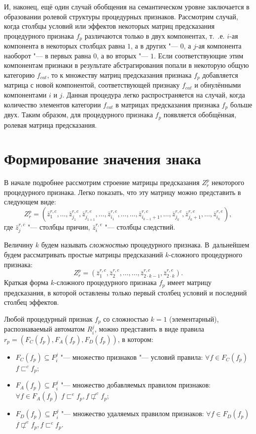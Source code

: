 \documentclass[a4paper, 12pt]{article}
\theoremstyle{plain}
\begin{document}
	И, наконец, ещё один случай обобщения на семантическом уровне заключается в образовании ролевой структуры процедурных признаков. Рассмотрим случай, когда столбцы условий или эффектов некоторых матриц предсказания процедурного признака $f_p$ различаются только в двух компонентах, т.~.е. $i$-ая компонента в некоторых столбцах равна $1$, а в других "--- $0$, а $j$-ая компонента наоборот "--- в первых равна $0$, а во вторых "--- $1$. Если соответствующие этим компонентам признаки в результате абстрагирования попали в некоторую общую категорию $f_{cat}$, то к множеству матриц предсказания признака $f_p$ добавляется матрица с новой компонентой, соответствующей признаку $f_{cat}$ и обнулёнными компонентами $i$ и $j$. Данная процедура легко распространяется на случай, когда количество элементов категории $f_{cat}$ в матрицах предсказания признака $f_p$ больше двух. Таким образом, для процедурного признака $f_p$ появляется обобщённая, ролевая матрица предсказания.

	\section{Формирование значения знака} \label{sect:link}
	В начале подробнее рассмотрим строение матрицы предсказания $Z_r^p$ некоторого процедурного признака. Легко показать, что эту матрицу можно представить в следующем виде:
	\begin{equation}
	Z_r^p=(\bar z_1^{r,c},\dots,\bar z_{j_1}^{r,c},\bar z_{j_{1+1}}^{r,e},\dots,\bar z_{i_1}^{r,e},\dots,\dots,\bar z_{i_{k-1}+1}^{r,c},\dots,\bar z_{j_k}^{r,c},\bar z_{j_k+1}^{r,e},\dots,\bar z_{i_k}^{r,e}),
	\end{equation}
	где $\bar z_j^{r,c}$ "--- столбцы причин, $\bar z_i^{r,e}$ "--- столбцы следствий. 
	
	Величину $k$ будем называть \textit{сложностью} процедурного признака. В~дальнейшем будем рассматривать простые матрицы предсказаний $k$-сложного процедурного признака:
	\begin{equation}
	Z_r^p=(\bar z_1^{r,c},\bar z_2^{r,e},\dots,\dots,\bar z_{2\cdot k-1}^{r,c},\bar z_{2\cdot k}^{r,e}).
	\end{equation}
	Краткая форма $k$-сложного процедурного признака $f_p$ имеет матрицу предсказания, в которой оставлены только первый столбец условий и последний столбец эффектов.
	
	Любой процедурный признак $f_p$ со сложностью $k=1$ (элементарный), распознаваемый автоматом $R_i^j$, можно представить в виде правила $r_p=(F_C(f_p),F_A(f_p),F_D(f_p))$, в котором:
	\begin{itemize}
		\item $F_C (f_p )\subseteq F_i^j$ "--- множество признаков "--- условий правила: $\forall f\in F_C(f_p)$ $f\sqsubset^c f_p$;
		\item $F_A(f_p)\subseteq F_i^j$ "--- множество добавляемых правилом признаков: $\forall f\in F_A(f_p)$ $f\sqsubset^e f_p,f\not\sqsubset^c f_p$;
		\item $F_D(f_p)\subseteq F_i^j$ "--- множество удаляемых правилом признаков: $\forall f\in F_D(f_p)$ $f\not\sqsubset^e f_p,f\sqsubset^c f_p$.
	\end{itemize}
	
\end{document}
